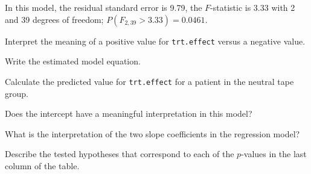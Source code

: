 {In this model, the residual standard error is 9.79, the $F$-statistic is 3.33 with 2 and 39 degrees of freedom; $P(F_{2,39} > 3.33) = 0.0461$.

\begin{parts}
	
	\item Interpret the meaning of a positive value for \texttt{trt.effect} versus a negative value.
	
	\item Write the estimated model equation.
	
	\item Calculate the predicted value for \texttt{trt.effect} for a patient in the neutral tape group. 
	
	\item Does the intercept have a meaningful interpretation in this model?
	
	\item What is the interpretation of the two slope coefficients in the regression model?
	
	\item Describe the tested hypotheses that correspond to each of the $p$-values in the last column of the table.
	
\end{parts}	

}{}


